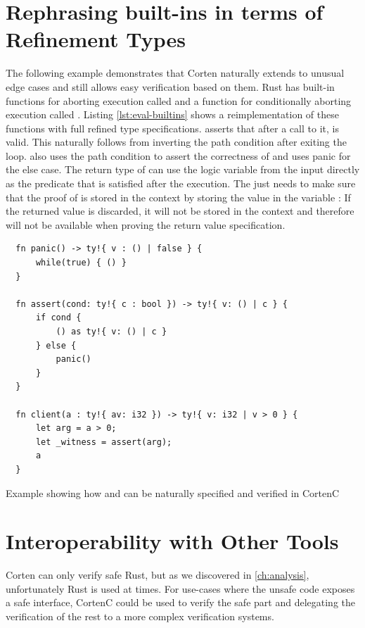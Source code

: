 \documentclass[twoside, english]{sdqthesis}
\theoremstyle{definition}
\begin{document}
\section{Rephrasing built-ins in terms of Refinement Types}

The following example demonstrates that Corten naturally extends to unusual edge cases and still allows easy verification based on them.
Rust has built-in functions for aborting execution \- called  \- and a function for conditionally aborting execution \- called . Listing \ref{lst:eval-builtins} shows a reimplementation of these functions with full refined type specifications. 
 asserts that after a call to it,  is valid. This naturally follows from inverting the path condition after exiting the loop. 
 also uses the path condition to assert the correctness of  and uses panic for the else case. The return type of  can use the logic variable  from the input directly as the predicate that is satisfied after the execution.
The  just needs to make sure that the proof of  is stored in the context by storing the value in the variable : If the returned value is discarded, it will not be stored in the context and therefore will not be available when proving the return value specification.


\begin{listing}[h]
  \begin{verbatim}
  fn panic() -> ty!{ v : () | false } {
      while(true) { () }
  }

  fn assert(cond: ty!{ c : bool }) -> ty!{ v: () | c } {
      if cond {
          () as ty!{ v: () | c }
      } else {
          panic()
      }
  }

  fn client(a : ty!{ av: i32 }) -> ty!{ v: i32 | v > 0 } {
      let arg = a > 0;
      let _witness = assert(arg);
      a
  }
  \end{verbatim}
  \caption{Example showing how  and  can be naturally specified and verified in CortenC}
  \label{lst:eval-builtins}
\end{listing}


\section{Interoperability with Other Tools}

Corten can only verify safe Rust, but as we discovered in \cref{ch:analysis}, unfortunately  Rust is used at times.
For use-cases where the unsafe code exposes a safe interface, CortenC could be used to verify the safe part and delegating the verification of the rest to a more complex verification systems. 
\end{document}
